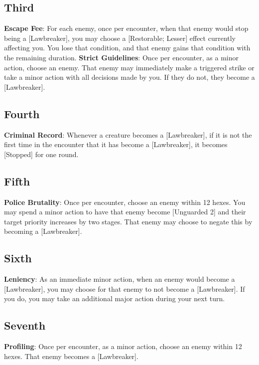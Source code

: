 \begin{multicols*}{2}
\subsection*{Third \Facet\perk}
\textbf{Escape Fee}: For each enemy, once per encounter, when that enemy would stop being a [Lawbreaker], you may choose a [Restorable; Lesser] effect currently affecting you. You lose that condition, and that enemy gains that condition with the remaining duration.
\textbf{Strict Guidelines}: Once per encounter, as a minor action, choose an enemy. That enemy may immediately make a triggered strike or take a minor action with all decisions made by you. If they do not, they become a [Lawbreaker].

\subsection*{Fourth \Facet\perk}
\textbf{Criminal Record}: Whenever a creature becomes a [Lawbreaker], if it is not the first time in the encounter that it has become a [Lawbreaker], it becomes [Stopped] for one round.

\subsection*{Fifth \Facet\perk}
\textbf{Police Brutality}: Once per encounter, choose an enemy within 12 hexes. You may spend a minor action to have that enemy become [Unguarded 2] and their target priority increases by two stages. That enemy may choose to negate this by becoming a [Lawbreaker].

\subsection*{Sixth \Facet\perk}
\textbf{Leniency}: As an immediate minor action, when an enemy would become a [Lawbreaker], you may choose for that enemy to not become a [Lawbreaker]. If you do, you may take an additional major action during your next turn.

\subsection*{Seventh \Facet\perk}
\textbf{Profiling}: Once per encounter, as a minor action, choose an enemy within 12 hexes. That enemy becomes a [Lawbreaker].

\end{multicols*}